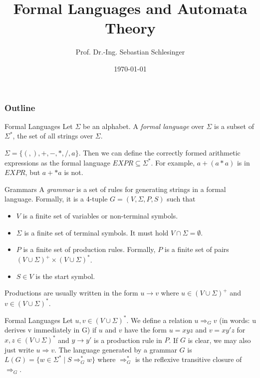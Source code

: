 \documentclass{beamer}
\title[Formal Languages and Automata Theory]{Formal Languages and Automata Theory}
\author[Sebastian Schlesinger]{Prof. Dr.-Ing. Sebastian Schlesinger}
\institute[HWR Berlin]{Berlin School for Economics and Law}
\date{\today}
\begin{document}
 \begin{frame}
\titlepage
\end{frame}



\begin{frame}
  \frametitle{Outline}
  \tableofcontents
\end{frame}

\begin{frame}{Formal Languages}
Let $\Sigma$ be an alphabet. A \textit{formal language} over $\Sigma$ is a subset of $\Sigma^*$, the set of all strings over $\Sigma$.

\begin{example}
    $\Sigma=\{(,),+,-,*,/,a\}$. Then we can define the correctly formed arithmetic expressions as the formal language $EXPR\subseteq \Sigma^*$. For example, $a+(a*a)$ is in $EXPR$, but $a+*a$ is not.
\end{example}
\end{frame}

\begin{frame}{Grammars}
    A \textit{grammar} is a set of rules for generating strings in a formal language. Formally, it is a 4-tuple $G=(V,\Sigma,P,S)$ such that 
    \begin{itemize}
        \item $V$ is a finite set of variables or non-terminal symbols.
        \item $\Sigma$ is a finite set of terminal symbols. It must hold $V\cap \Sigma = \emptyset$.
        \item $P$ is a finite set of production rules. Formally, $P$ is a finite set of pairs $(V\cup \Sigma)^+\times (V\cup \Sigma)^*$.
        \item $S\in V$ is the start symbol.
    \end{itemize}

    Productions are usually written in the form $u\rightarrow v$ where $u\in (V\cup \Sigma)^+$ and $v\in (V\cup \Sigma)^*$.
\end{frame}

\begin{frame}{Formal Languages}
    Let $u,v\in (V\cup \Sigma)^*$. We define a relation $u\Rightarrow_G v$ (in words: u derives v immediately in G) if $u$ and $v$ have the form
    \vspace{0.5cm}
    $u=xyz$ and $v=xy'z$ for $x,z\in (V\cup \Sigma)^*$ and $y\to y'$ is a production rule in $P$. If $G$ is clear, we may also just write $u\Rightarrow v$.
    \vspace{0.5cm}
    The language generated by a grammar $G$ is $L(G)=\{w\in \Sigma^*\mid S\Rightarrow^*_G w\}$ where $\Rightarrow^*_G$ is the reflexive transitive closure of $\Rightarrow_G$.
    
\end{frame}
\end{document}

